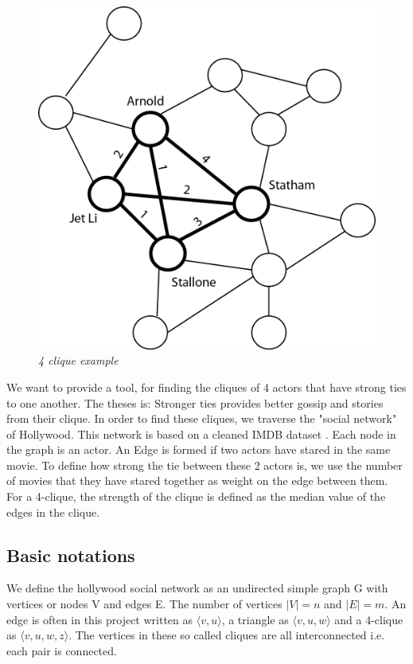 \documentclass{article}
\begin{document}
\begin{figure}[H]
\begin{center}
\includegraphics[scale=0.45]{graph_4clique.png}
\end{center}
\caption{\small {\it {4 clique example}}} 
\label{fig: 4clique example}
\end{figure}

We want to provide a tool, for finding the cliques of 4 actors that have strong ties to one another. The theses is: Stronger ties provides better gossip and stories from their clique. In order to find these cliques, we traverse the "social network" of Hollywood. This network is based on a cleaned IMDB dataset \cite{imdb}.
Each node in the graph is an actor. An Edge is formed if two actors have stared in the same movie. To define how strong the tie between these 2 actors is, we use the number of movies that they have stared together as weight on the edge between them. For a 4-clique, the strength of the clique is defined as the median value of the edges in the clique.

\subsection{Basic notations}
We define the hollywood social network as an undirected simple graph G with vertices or nodes V and edges E. The number of vertices $|V| = n$ and $|E| = m$. An edge is often in this project written as $\langle v,u\rangle$, a triangle as $\langle v,u,w\rangle$ and a 4-clique as $\langle v,u,w,z\rangle$. The vertices in these so called cliques are all interconnected i.e. each pair is connected.
\end{document}
